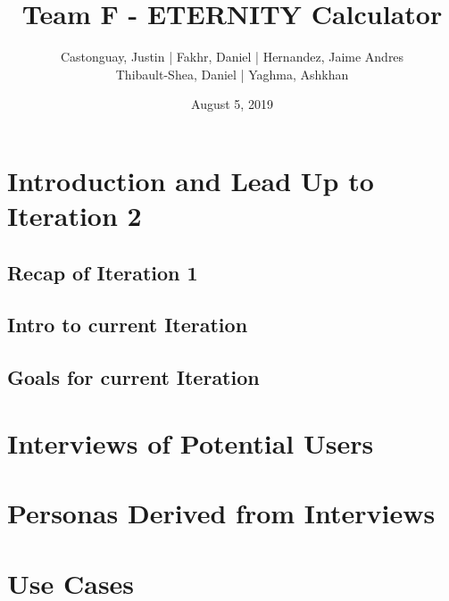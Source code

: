 \documentclass[a4paper]{article}
\begin{document}
\title{\LARGE{\textbf{Team F - ETERNITY Calculator}}}
\author{
	Castonguay, Justin | Fakhr, Daniel | Hernandez, Jaime Andres \\ Thibault-Shea, Daniel |
	Yaghma, Ashkhan \\
}
\date{August 5, 2019}

\fancyhf{}

\clearpage\maketitle
\thispagestyle{empty} %
\pagebreak

\setcounter{page}{2} %
\fancyhf{}
\renewcommand{\headrulewidth}{2pt}
\renewcommand{\footrulewidth}{1pt}
\fancyhead[LE,RO]{\rightmark}
\tableofcontents
\pagebreak


\section{Introduction and Lead Up to Iteration 2}

\subsection{Recap of Iteration 1}

\subsection{Intro to current Iteration}

\subsection{Goals for current Iteration}

\section{Interviews of Potential Users}

\section{Personas Derived from Interviews}

\section{Use Cases}
\end{document}
